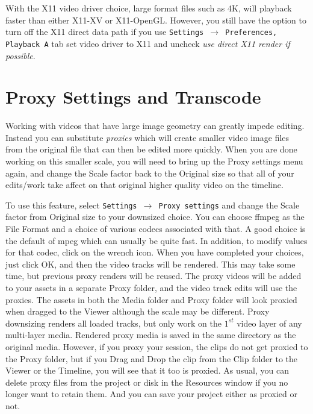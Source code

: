 With the X11 video driver choice, large format files such as 4K, will playback faster than either X11-XV or X11-OpenGL.  However, you still have the option to turn off the X11 direct data path if you use
\texttt{Settings $\rightarrow$ Preferences, Playback A} tab set video driver to X11 and uncheck \textit{use direct X11 render if possible}.


\section{Proxy Settings and Transcode}%
\label{sec:proxy_settings}

Working with videos that have large image geometry can greatly impede editing.  Instead you can substitute \textit{proxies} which will create smaller video image files from the original file that can then be edited more quickly.   When you are done working on this smaller scale, you will need to bring up the Proxy settings menu again, and change the Scale factor back to the Original size so that all of your edits/work take affect on that original higher quality video on the timeline.  

To use this feature, select \texttt{Settings $\rightarrow$ Proxy settings} and change the Scale factor from Original size to your downsized choice.  You can choose ffmpeg as the File Format and a choice of various codecs associated with that.  A good choice is the default of mpeg which can usually be quite fast.  In addition, to modify values for that codec, click on the wrench icon.  When you have completed your choices, just click OK, and then the video tracks will be rendered. This may take some time, but previous proxy renders will be reused.  
The proxy videos will be added to your assets in a separate Proxy folder, and the video track edits will use the proxies.
The assets in both the Media folder and Proxy folder will look proxied when dragged to the Viewer although the scale may be different.
Proxy downsizing renders all loaded tracks, but only work on the $1^{st}$ video layer of any multi-layer media.  Rendered proxy media is saved in the same directory as the original media.
However, if you proxy your session, the clips do not get proxied to the Proxy folder, but if you Drag and Drop the clip from the Clip folder to the Viewer or the Timeline, you will see that it too is proxied.  
As usual, you can delete proxy files from the project or disk in the Resources window if you no longer want to retain them.
And you can save your project either as proxied or not.

